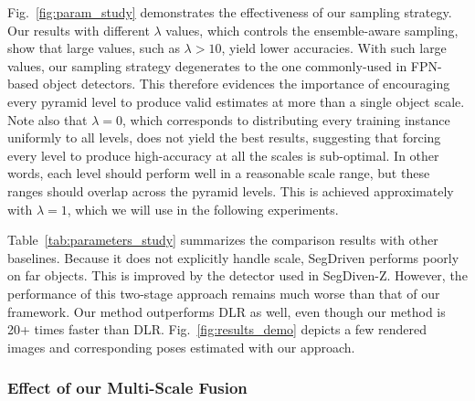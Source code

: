 Fig.~\ref{fig:param_study} demonstrates the effectiveness of our sampling strategy.
Our results with different $\lambda$ values, which controls the ensemble-aware sampling, show that large values, such as $\lambda>10$, yield lower accuracies. With such large values, our sampling strategy degenerates to the one commonly-used in FPN-based object detectors. This therefore evidences the importance of encouraging every pyramid level to produce valid estimates at more than a single object scale. 
Note also that $\lambda=0$, which corresponds to distributing every training instance uniformly to all levels, does not yield the best results, suggesting that forcing every level to produce high-accuracy at all the scales is sub-optimal. In other words, each level should perform well in a reasonable scale range, but these ranges should overlap across the pyramid levels. 
This is achieved approximately with $\lambda=1$, which we will use in the following experiments.

Table~\ref{tab:parameters_study} summarizes the comparison results with other baselines. Because it does not explicitly handle scale, SegDriven performs poorly on far objects. This is improved by the detector used in SegDiven-Z. However, the performance of this two-stage approach remains much worse than that of our framework.
Our method outperforms DLR as well, even though our method is 20+ times faster than DLR.
Fig.~\ref{fig:results_demo} depicts a few rendered images and corresponding poses estimated with our approach. 





\subsubsection{Effect of our Multi-Scale Fusion}

